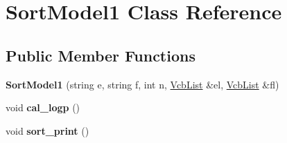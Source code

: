 \hypertarget{classSortModel1}{\section{\-Sort\-Model1 \-Class \-Reference}
\label{classSortModel1}
}
\subsection*{\-Public \-Member \-Functions}
\begin{DoxyCompactItemize}
\item 
\hypertarget{classSortModel1_aa5d6f3e0798649369a2c602ba61d37c1}{{\bfseries \-Sort\-Model1} (string e, string f, int n, \hyperlink{classVcbList}{\-Vcb\-List} \&el, \hyperlink{classVcbList}{\-Vcb\-List} \&fl)}\label{classSortModel1_aa5d6f3e0798649369a2c602ba61d37c1}

\item 
\hypertarget{classSortModel1_a65bf3ac8559a5ad2384b54535525ac7e}{void {\bfseries cal\-\_\-logp} ()}\label{classSortModel1_a65bf3ac8559a5ad2384b54535525ac7e}

\item 
\hypertarget{classSortModel1_a9350f1cde41c75bbd45a899816509d83}{void {\bfseries sort\-\_\-print} ()}\label{classSortModel1_a9350f1cde41c75bbd45a899816509d83}

\end{DoxyCompactItemize}
